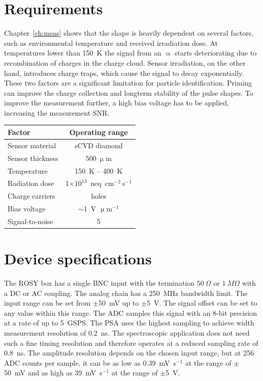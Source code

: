 \section{Requirements}
Chapter~\ref{ch:meas} shows that the shape is heavily dependent on several factors, such as environmental temperature and received irradiation dose. At temperatures lower than 150~K the signal from an $\upalpha$ starts deteriorating due to recombination of charges in the charge cloud. Sensor irradiation, on the other hand, introduces charge traps, which cause the signal to decay exponentially. These two factors are a significant limitation for particle identification. Priming can improve the charge collection and longterm stability of the pulse shapes. To improve the measurement further, a high bias voltage has to be applied, increasing the measurement SNR. 
\begin{center}
\begin{tabular}{l*{1}{c}}
Factor              & Operating range \\
\hline
Sensor material & sCVD diamond \\
Sensor thickness & $500~\upmu$m \\
Temperature & 150~K -- 400~K \\
Radiation dose & 1$\times10^{13}$~neq~cm$^{-2}~$s$^{-1}$ \\
Charge carriers & holes \\
Bias voltage & $\sim$1~V $\upmu$m$^{-1}$ \\
Signal-to-noise & 5 \\
\end{tabular}
\label{tab:limits}
\end{center}



\section{Device specifications}
The ROSY box has a single BNC input with the termination $50~\Omega$ or $1~M\Omega$ with a DC or AC coupling. The analog chain has a 250~MHz bandwidth limit. The input range can be set from $\pm$50~mV up to $\pm$5~V. The signal offset can be set to any value within this range. The ADC samples this signal with an 8-bit precision at a rate of up to 5~GSPS. The PSA uses the highest sampling to achieve width measurement resolution of 0.2~ns. The spectroscopic application does not need such a fine timing resolution and therefore operates at a reduced sampling rate of 0.8~ns. The amplitude resolution depends on the chosen input range, but at 256 ADC counts per sample, it can be as low as 0.39~mV~s$^{-1}$ at the range of $\pm$50~mV and as high as 39~mV~s$^{-1}$ at the range of $\pm$5~V.

